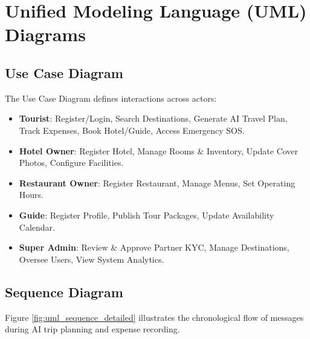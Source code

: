\documentclass[12pt,a4paper]{report}
\begin{document}
\section{Unified Modeling Language (UML) Diagrams}

\subsection{Use Case Diagram}
The Use Case Diagram defines interactions across actors:
\begin{itemize}
    \item \textbf{Tourist}: Register/Login, Search Destinations, Generate AI Travel Plan, Track Expenses, Book Hotel/Guide, Access Emergency SOS.
    \item \textbf{Hotel Owner}: Register Hotel, Manage Rooms \& Inventory, Update Cover Photos, Configure Facilities.
    \item \textbf{Restaurant Owner}: Register Restaurant, Manage Menus, Set Operating Hours.
    \item \textbf{Guide}: Register Profile, Publish Tour Packages, Update Availability Calendar.
    \item \textbf{Super Admin}: Review \& Approve Partner KYC, Manage Destinations, Oversee Users, View System Analytics.
\end{itemize}

\subsection{Sequence Diagram}
Figure \ref{fig:uml_sequence_detailed} illustrates the chronological flow of messages during AI trip planning and expense recording.
\end{document}
